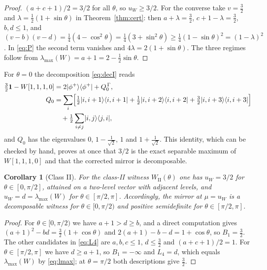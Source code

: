 \documentclass[11pt,a4paper]{article}
\newtheorem{corollary}[theorem]{Corollary}
\theoremstyle{remark}
\newcommand{\ketbra}[2]{\lvert #1\rangle\langle #2\rvert}
\newcommand{\id}{\mathbf{1}}
\newcommand{\G}{\Gamma}
\newcommand{\uW}{u_W}
\newcommand{\lmax}{\lambda_{\max}}
\begin{document}
\begin{proof}
$(a+c+1)/2=3/2$ for all $\theta$, so $\uW\ge3/2$. For the converse take $v=\tfrac32$ and
$\lambda=\tfrac12(1+\sin\theta)$ in Theorem~\ref{thm:cert}: then $a+\lambda=\tfrac32$,
$c+1-\lambda=\tfrac32$, $b,d\le1$, and
$(v-b)(v-d)=\tfrac14(4-\cos^2\theta)=\tfrac14(3+\sin^2\theta)\ge\tfrac14(1-\sin\theta)^2
=(1-\lambda)^2$. In \eqref{eq:P} the second term vanishes and $4\lambda=2(1+\sin\theta)$.
The three regimes follow from $\lmax(W)=a+1=2-\tfrac12\sin\theta$.
\end{proof}

For $\theta=0$ the decomposition \eqref{eq:decI} reads
\begin{equation}\label{eq:dec1110}
\begin{aligned}
\tfrac32\id-W[1,1,1,0]&=2\ketbra{\phi^+}{\phi^+}+Q_0^{\,\G},\\
Q_0&=\sum_i\Bigl[\tfrac12\ketbra{i,i+1}{i,i+1}+\tfrac12\ketbra{i,i+2}{i,i+2}
+\tfrac32\ketbra{i,i+3}{i,i+3}\Bigr]\\
&\quad+\tfrac12\sum_{i\neq j}\ketbra{i,j}{j,i},
\end{aligned}
\end{equation}
and $Q_0$ has the eigenvalues $0$, $1-\tfrac{1}{\sqrt2}$, $1$ and $1+\tfrac{1}{\sqrt2}$.
This identity, which can be checked by hand, proves at once that $3/2$ is the exact
separable maximum of $W[1,1,1,0]$ and that the corrected mirror is decomposable.

\begin{corollary}[Class II]\label{cor:classII}
For the class-II witness $W_{\mathrm{II}}(\theta)$ one has $\uW=3/2$ for
$\theta\in[0,\pi/2]$, attained on a two-level vector with adjacent levels, and
$\uW=d=\lmax(W)$ for $\theta\in[\pi/2,\pi]$. Accordingly, the mirror at $\mu=\uW$ is a
decomposable witness for $\theta\in[0,\pi/2)$ and positive semidefinite for
$\theta\in[\pi/2,\pi]$.
\end{corollary}

\begin{proof}
For $\theta\in[0,\pi/2)$ we have $a+1>d\ge b$, and a direct computation gives
$(a+1)^2-bd=\tfrac32(1+\cos\theta)$ and $2(a+1)-b-d=1+\cos\theta$, so $B_1=\tfrac32$. The
other candidates in \eqref{eq:L4} are $a,b,c\le1$, $d\le\tfrac32$ and $(a+c+1)/2=1$. For
$\theta\in[\pi/2,\pi]$ we have $d\ge a+1$, so $B_1=-\infty$ and $L_4=d$, which equals
$\lmax(W)$ by \eqref{eq:lmax}; at $\theta=\pi/2$ both descriptions give $\tfrac32$.
\end{proof}
\end{document}
